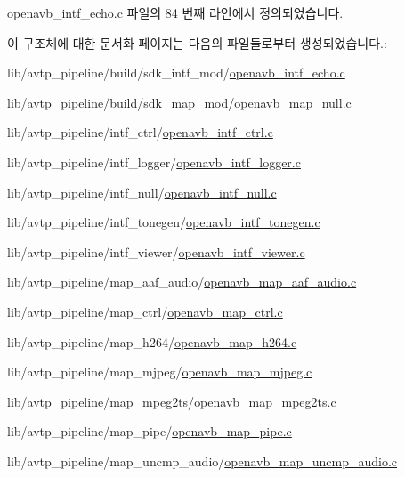 openavb\+\_\+intf\+\_\+echo.\+c 파일의 84 번째 라인에서 정의되었습니다.



이 구조체에 대한 문서화 페이지는 다음의 파일들로부터 생성되었습니다.\+:\begin{DoxyCompactItemize}
\item 
lib/avtp\+\_\+pipeline/build/sdk\+\_\+intf\+\_\+mod/\hyperlink{build_2sdk__intf__mod_2openavb__intf__echo_8c}{openavb\+\_\+intf\+\_\+echo.\+c}\item 
lib/avtp\+\_\+pipeline/build/sdk\+\_\+map\+\_\+mod/\hyperlink{build_2sdk__map__mod_2openavb__map__null_8c}{openavb\+\_\+map\+\_\+null.\+c}\item 
lib/avtp\+\_\+pipeline/intf\+\_\+ctrl/\hyperlink{openavb__intf__ctrl_8c}{openavb\+\_\+intf\+\_\+ctrl.\+c}\item 
lib/avtp\+\_\+pipeline/intf\+\_\+logger/\hyperlink{openavb__intf__logger_8c}{openavb\+\_\+intf\+\_\+logger.\+c}\item 
lib/avtp\+\_\+pipeline/intf\+\_\+null/\hyperlink{openavb__intf__null_8c}{openavb\+\_\+intf\+\_\+null.\+c}\item 
lib/avtp\+\_\+pipeline/intf\+\_\+tonegen/\hyperlink{openavb__intf__tonegen_8c}{openavb\+\_\+intf\+\_\+tonegen.\+c}\item 
lib/avtp\+\_\+pipeline/intf\+\_\+viewer/\hyperlink{openavb__intf__viewer_8c}{openavb\+\_\+intf\+\_\+viewer.\+c}\item 
lib/avtp\+\_\+pipeline/map\+\_\+aaf\+\_\+audio/\hyperlink{openavb__map__aaf__audio_8c}{openavb\+\_\+map\+\_\+aaf\+\_\+audio.\+c}\item 
lib/avtp\+\_\+pipeline/map\+\_\+ctrl/\hyperlink{openavb__map__ctrl_8c}{openavb\+\_\+map\+\_\+ctrl.\+c}\item 
lib/avtp\+\_\+pipeline/map\+\_\+h264/\hyperlink{openavb__map__h264_8c}{openavb\+\_\+map\+\_\+h264.\+c}\item 
lib/avtp\+\_\+pipeline/map\+\_\+mjpeg/\hyperlink{openavb__map__mjpeg_8c}{openavb\+\_\+map\+\_\+mjpeg.\+c}\item 
lib/avtp\+\_\+pipeline/map\+\_\+mpeg2ts/\hyperlink{openavb__map__mpeg2ts_8c}{openavb\+\_\+map\+\_\+mpeg2ts.\+c}\item 
lib/avtp\+\_\+pipeline/map\+\_\+pipe/\hyperlink{openavb__map__pipe_8c}{openavb\+\_\+map\+\_\+pipe.\+c}\item 
lib/avtp\+\_\+pipeline/map\+\_\+uncmp\+\_\+audio/\hyperlink{openavb__map__uncmp__audio_8c}{openavb\+\_\+map\+\_\+uncmp\+\_\+audio.\+c}\item 

\end{DoxyCompactItemize}
